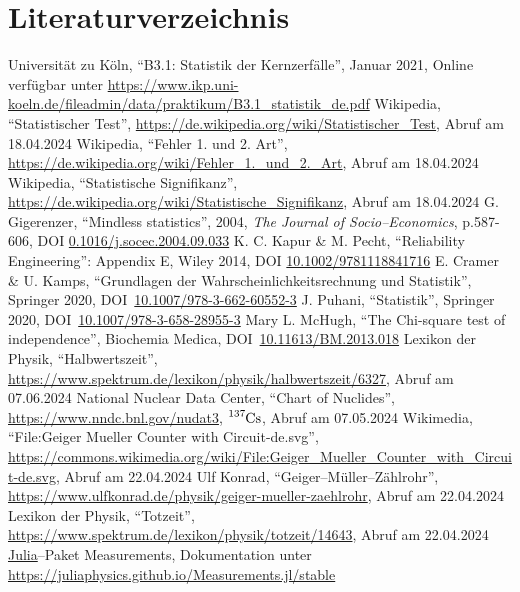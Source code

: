 \documentclass[12pt,a4paper]{scrartcl}
\numberwithin{equation}{section} %
\newcommand{\code}[1]{\textsf{#1}}
\renewcommand{\[}{} %
\renewcommand{\]}{\noindent} %
\begin{document}
\clearpage
\hypertarget{literatur}{\section{Literaturverzeichnis}\label{literatur}}
\renewcommand{\section}[2]{}

\begin{thebibliography}{99}
	Universität zu Köln, ``B3.1: Statistik der Kernzerfälle'', Januar
	2021, Online verfügbar unter
	\url{https://www.ikp.uni-koeln.de/fileadmin/data/praktikum/B3.1_statistik_de.pdf}
	Wikipedia, ``Statistischer Test'',
	\url{https://de.wikipedia.org/wiki/Statistischer_Test}, Abruf am
	18.04.2024
	Wikipedia, ``Fehler 1. und 2. Art'',
	\url{https://de.wikipedia.org/wiki/Fehler_1._und_2._Art}, Abruf am
	18.04.2024
	Wikipedia, ``Statistische Signifikanz'',
	\url{https://de.wikipedia.org/wiki/Statistische_Signifikanz}, Abruf am
	18.04.2024
	G. Gigerenzer, ``Mindless statistics'', 2004, \emph{The Journal of
	Socio--Economics}, p.587-606, DOI
	\href{https://doi.org/10.1016/j.socec.2004.09.033}{0.1016/j.socec.2004.09.033}
	K. C. Kapur \& M. Pecht, ``Reliability Engineering'': Appendix E,
	Wiley 2014, DOI
	\href{https://doi.org/10.1002/9781118841716}{10.1002/9781118841716}
	E. Cramer \& U. Kamps, ``Grundlagen der Wahrscheinlichkeitsrechnung
	und Statistik'', Springer 2020, DOI~\href{https://doi.org/10.1007/978-3-662-60552-3}{10.1007/978-3-662-60552-3}
	J. Puhani, ``Statistik'', Springer 2020, DOI~\href{https://doi.org/10.1007/978-3-658-28955-3}{10.1007/978-3-658-28955-3}
	Mary L. McHugh, ``The Chi-square test of independence'', Biochemia Medica, DOI~\href{https://doi.org/10.11613/BM.2013.018}{10.11613/BM.2013.018}
	Lexikon der Physik, ``Halbwertszeit'', \url{https://www.spektrum.de/lexikon/physik/halbwertszeit/6327}, Abruf am 07.06.2024
	National Nuclear Data Center, ``Chart of Nuclides'',
	\url{https://www.nndc.bnl.gov/nudat3}, $\ce{^{137}Cs}$,
	Abruf am 07.05.2024
	Wikimedia, ``File:Geiger Mueller Counter with Circuit-de.svg'', \url{https://commons.wikimedia.org/wiki/File:Geiger_Mueller_Counter_with_Circuit-de.svg}, Abruf am 22.04.2024
	Ulf Konrad, ``Geiger--Müller--Zählrohr'', \url{https://www.ulfkonrad.de/physik/geiger-mueller-zaehlrohr}, Abruf am 22.04.2024
	Lexikon der Physik, ``Totzeit'', \url{https://www.spektrum.de/lexikon/physik/totzeit/14643}, Abruf am 22.04.2024
	\code{\hyperlink{https://julialang.org}{Julia}}--Paket \code{Measurements}, Dokumentation unter \url{https://juliaphysics.github.io/Measurements.jl/stable}
\end{thebibliography}
\end{document}
